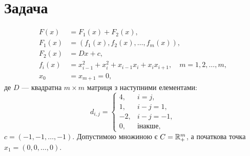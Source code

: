 \section{Задача}

\begin{problem}
    \begin{equation}
        \begin{aligned}
            F(x) &= F_1(x) + F_2(x), \\
            F_1(x) &= (f_1(x), f_2(x), \dots, f_m(x)), \\
            F_2(x) &= D x + c, \\
            f_i(x) &= x_{i - 1}^2 + x_i^2 + x_{i - 1} x_i + x_i x_{i + 1}, \quad m = 1, 2, \dots, m, \\
            x_0 &= x_{m + 1} = 0,
        \end{aligned}
    \end{equation}
    де $D$ --- квадратна $m \times m$ матриця з наступними елементами:
    \begin{equation}
        d_{i,j} = \begin{cases}
            4, & i = j, \\
            1, & i - j = 1, \\
            -2, & i - j = -1, \\
            0, & \text{інакше},
        \end{cases}
    \end{equation}
    $c = (-1, -1, \dots, -1)$. Допустимою множиною є $C = \mathbb{R}_+^m$, а початкова точка $x_1 = (0, 0, \dots, 0)$.
\end{problem}
